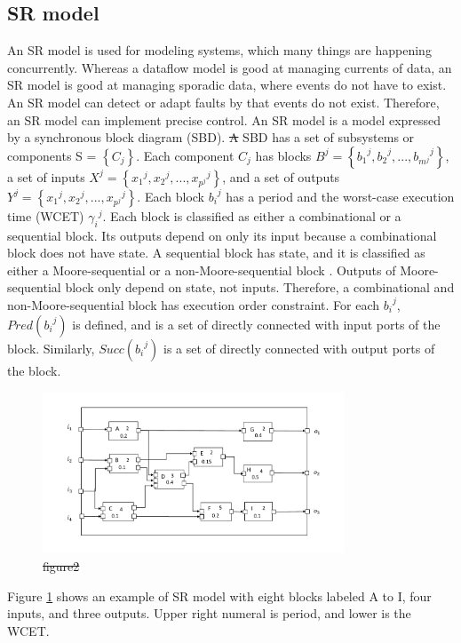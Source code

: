 \documentclass[conference,compsoc]{IEEEtran}
\providecommand{\DIFadd}[1]{{\protect\color{blue}\uwave{#1}}} %
\providecommand{\DIFdel}[1]{{\protect\color{red}\sout{#1}}}                      %
\providecommand{\DIFaddbegin}{} %
\providecommand{\DIFaddend}{} %
\providecommand{\DIFdelbegin}{} %
\providecommand{\DIFdelend}{} %
\providecommand{\DIFaddFL}[1]{\DIFadd{#1}} %
\providecommand{\DIFdelFL}[1]{\DIFdel{#1}} %
\providecommand{\DIFaddbeginFL}{} %
\providecommand{\DIFaddendFL}{} %
\providecommand{\DIFdelbeginFL}{} %
\providecommand{\DIFdelendFL}{} %
\begin{document}
\subsection{SR model}
An SR model is used for modeling systems, which many things are happening concurrently.
Whereas a dataflow model is good at managing currents of data, an SR model is good at managing sporadic data, where events do not have to exist.
An SR model can detect or adapt faults by that events do not exist.
Therefore, an SR model can implement precise control.
An SR model is a model expressed by a synchronous block diagram (SBD).
\DIFdelbegin \DIFdel{A }\DIFdelend \DIFaddbegin \DIFadd{An }\DIFaddend SBD has a set of subsystems or components S = $\left\{C_j\right\}$. 
Each component $C_j$ has blocks $B^j = \left\{{{b_1}^j, {b_2}^j,...,{b_{m^j}}^j}\right\}$, a set of inputs $X^j = \left\{{x_1}^j,{x_2}^j,...,{x_{p^j}}^j\right\}$,
and a set of outputs $Y^j = \left\{{x_1}^j,{x_2}^j,...,{x_{p^j}}^j\right\}$.
Each block ${b_i}^j$ has a period and the worst-case execution time (WCET) ${\gamma_i}^j$.
Each block is classified as either a combinational or a sequential block.
Its outputs depend on only its input because a combinational block does not have state.
A sequential block has state, and it is classified as either a Moore-sequential or a non-Moore-sequential block \cite{Lublinerman:2009:MCG:1480881.1480893}.
Outputs of Moore-sequential block only depend on state, not inputs.
Therefore, a combinational and  non-Moore-sequential block has execution order constraint.
For each ${b_i}^j$, $Pred({b_i}^j)$ is defined, and is a set of directly connected with input ports of the block.
Similarly, $Succ({b_i}^j)$ is a set of directly connected with output ports of the block.
\begin{figure}
	\centering
	\includegraphics[width=9cm,clip]{figure5.pdf}
	\caption{\DIFdelbeginFL \DIFdelFL{figure2}\DIFdelendFL \DIFaddbeginFL \DIFaddFL{Example of a block diagram}\DIFaddendFL }
	\label{fig2}
\end{figure}

Figure \ref{fig2} shows an example of SR model with eight blocks labeled A to I, four inputs, and three outputs.
Upper right numeral is period, and lower is the WCET.
\end{document}
